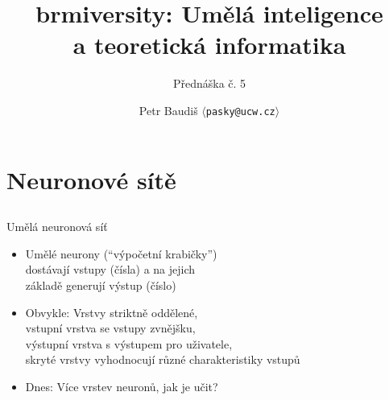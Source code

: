 \documentclass{beamer}
\begin{document}

\title{brmiversity: Umělá inteligence \\ a teoretická informatika}
\subtitle{Přednáška č. 5}
\author{Petr Baudiš $\langle${\tt pasky@ucw.cz}$\rangle$}
\date{}
\frame{\titlepage}

\section{Neuronové sítě}

\subsection{}
\begin{frame}{Umělá neuronová síť}
\begin{itemize}
\item Umělé neurony (``výpočetní krabičky'') \\ dostávají vstupy (čísla) a na jejich \\ základě generují výstup (číslo)
\item Obvykle: Vrstvy striktně oddělené, \\ vstupní vrstva se vstupy zvnějšku, \\ výstupní vrstva s výstupem pro uživatele, \\ skryté vrstvy vyhodnocují různé charakteristiky vstupů
\item Dnes: Více vrstev neuronů, jak je učit?
\end{itemize}
\end{frame}
\end{document}
